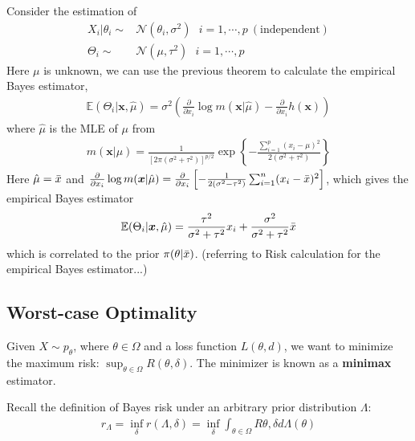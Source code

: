 \begin{example}
    Consider the estimation of 
    \begin{align}
        X_i|\theta_i\sim&\mathcal{N}(\theta_i,\sigma^2)~~~i=1,\cdots,p~(\text{independent})\\
        \Theta_i\sim&\mathcal{N}(\mu,\tau^2)~~~i=1,\cdots,p
    \end{align}
    Here $\mu$ is unknown, we can use the previous theorem to calculate the empirical Bayes estimator,
    \begin{gather}
        \mathbb{E}(\Theta_i|\boldsymbol{x},\hat{\mu})=\sigma^2\left(
            \frac{\partial}{\partial{x_i}}\log{m(\boldsymbol{x}|\hat{\mu})}
            -\frac{\partial}{\partial{x_i}}h(\boldsymbol{x})
        \right)
    \end{gather}
    where $\hat{\mu}$ is the MLE of $\mu$ from 
    \begin{gather}
        m(\boldsymbol{x}|\mu)=\frac{1}{[2\pi(\sigma^2+\tau^2)]^{p/2}}\exp\left\{
            -\frac{\sum_{i=1}^p(x_i-\mu)^2}{2(\sigma^2+\tau^2)}
        \right\}
    \end{gather}
    Here $\hat{\mu}=\Bar{x}$ and 
    $\frac{\partial}{\partial{x_i}}\log{m(\boldsymbol{x}|\hat{\mu})}
    =\frac{\partial}{\partial{x_i}}\left[
        -\frac{1}{2(\sigma^2-\tau^2)}\sum_{i=1}^n(x_i-\Bar{x})^2
    \right]$, which gives the empirical Bayes estimator
    \begin{gather}
        \mathbb{E}(\Theta_i|\boldsymbol{x},\hat{\mu})
        =\frac{\tau^2}{\sigma^2+\tau^2}x_i+\frac{\sigma^2}{\sigma^2+\tau^2}\Bar{x}
    \end{gather}
    which is correlated to the prior $\pi(\theta|\Bar{x})$.
    (referring to Risk calculation for the empirical Bayes estimator...)
\end{example}


\subsection{Worst-case Optimality}

Given $X\sim{p_\theta}$, where $\theta\in\Omega$ and a loss function $L(\theta,d)$,
we want to minimize the maximum risk: $\sup_{\theta\in\Omega}R(\theta,\delta)$.
The minimizer is known as a \textbf{minimax} estimator.

Recall the definition of Bayes risk under an arbitrary prior distribution $\Lambda$:
\begin{gather}
    r_\Lambda 
    = \inf_\delta{r(\Lambda,\delta)}
    = \inf_{\delta}\int_{\theta\in\Omega}R{\theta,\delta}d\Lambda(\theta)
\end{gather}


